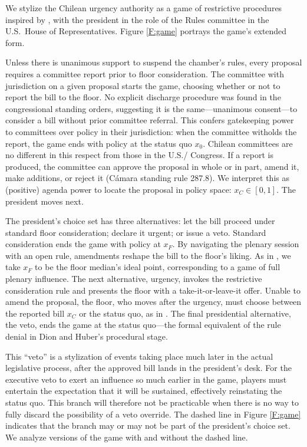 \documentclass[letter,12pt]{article}
\begin{document}
We stylize the Chilean urgency authority as a game of restrictive procedures inspired by \citet{dion.huber.1996}, with the president in the role of the Rules committee in the U.S.\ House of Representatives. Figure \ref{F:game} portrays the game's extended form.

Unless there is unanimous support to suspend the chamber's rules, every proposal requires a committee report prior to floor consideration. The committee with jurisdiction on a given proposal starts the game, choosing whether or not to report the bill to the floor. No explicit discharge procedure was found in the congressional standing orders, suggesting it is the same---unanimous consent---to consider a bill without prior committee referral. This confers gatekeeping power to committees over policy in their jurisdiction: when the committee witholds the report, the game ends with policy at the status quo $x_0$. Chilean committees are no different in this respect from those in the U.S./ Congress. If a report is produced, the committee can approve the proposal in whole or in part, amend it, make additions, or reject it (Cámara standing rule 287.8). We interpret this as (positive) agenda power to locate the proposal in policy space: $x_C \in [0,1]$. The president moves next. 

The president's choice set has three alternatives: let the bill proceed under standard floor consideration; declare it urgent; or issue a veto. Standard consideration ends the game with policy at $x_F$. By navigating the plenary session with an open rule, amendments reshape the bill to the floor's liking. As in \citet{shepsle.1979}, we take $x_F$ to be the floor median's ideal point, corresponding to a game of full plenary influence. The next alternative, urgency, invokes the restrictive consideration rule and presents the floor with a take-it-or-leave-it offer. Unable to amend the proposal, the floor, who moves after the urgency, must choose between the reported bill $x_C$ or the status quo, as in \citep{romer.rosenthal.1978}. The final presidential alternative, the veto, ends the game at the status quo---the formal equivalent of the rule denial in Dion and Huber's procedural stage.

This ``veto'' is a stylization of events taking place much later in the actual legislative process, after the approved bill lands in the president's desk. For the executive veto to exert an influence so much earlier in the game, players must entertain the expectation that it will be sustained, effectively reinstating the status quo. This branch will therefore not be practicable when there is no way to fully discard the possibility of a veto override. The dashed line in Figure \ref{F:game} indicates that the branch may or may not be part of the president's choice set. We analyze versions of the game with and without the dashed line. 
\end{document}

